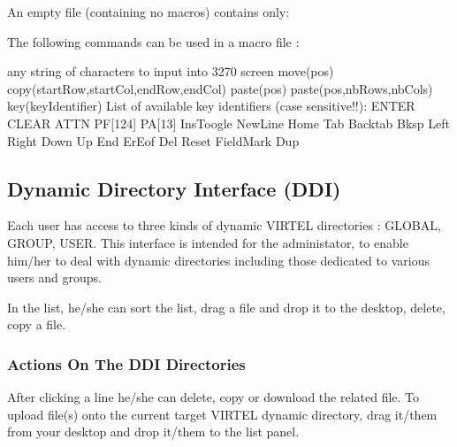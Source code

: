 \documentclass[letterpaper,10pt,english]{sphinxmanual}
\begin{document}

An empty file (containing no macros) contains only:

\begin{sphinxVerbatim}[commandchars=\\\{\}]
 \PYG{p}{[}\PYG{p}{]}
\end{sphinxVerbatim}

\label{\detokenize{User_Guide:v457ug-macro-commands}}

The following commands can be used in a macro file :

\begin{sphinxVerbatim}[commandchars=\\\{\}]
\PYGZdq{}any string of characters to input into 3270 screen\PYGZdq{}
move(pos)
copy(startRow,startCol,endRow,endCol)
paste(pos)
paste(pos,nbRows,nbCols)
key(keyIdentifier)
List of available key identifiers (case sensitive!!):
\PYGZhy{} ENTER
\PYGZhy{} CLEAR
\PYGZhy{} ATTN
\PYGZhy{} PF[1\PYGZhy{}24]
\PYGZhy{} PA[1\PYGZhy{}3]
\PYGZhy{} InsToogle
\PYGZhy{} NewLine
\PYGZhy{} Home
\PYGZhy{} Tab
\PYGZhy{} Backtab
\PYGZhy{} Bksp
\PYGZhy{} Left
\PYGZhy{} Right
\PYGZhy{} Down
\PYGZhy{} Up
\PYGZhy{} End
\PYGZhy{} ErEof
\PYGZhy{} Del
\PYGZhy{} Reset
\PYGZhy{} FieldMark
\PYGZhy{} Dup
\end{sphinxVerbatim}


\subsection{Dynamic Directory Interface (DDI)}
\label{\detokenize{User_Guide:dynamic-directory-interface-ddi}}
Each user has access to three kinds of dynamic VIRTEL directories : GLOBAL, GROUP, USER.
This interface is intended for the administator, to enable him/her to deal with dynamic directories including those
dedicated to various users and groups.

In the list, he/she can sort the list, drag a file and drop it to the desktop, delete, copy a file.


\subsubsection{Actions On The DDI Directories}
\label{\detokenize{User_Guide:actions-on-the-ddi-directories}}
After clicking a line he/she can delete, copy or download the related file.
To upload file(s) onto the current target VIRTEL dynamic directory, drag it/them from your desktop and drop it/them to
the list panel.
\end{document}
